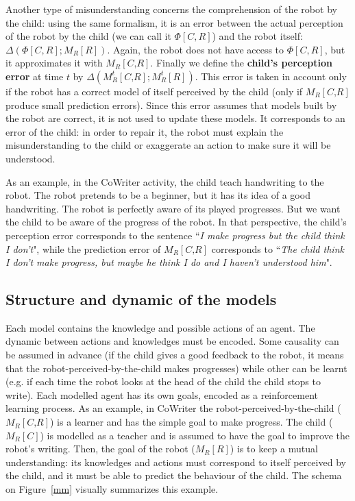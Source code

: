 \documentclass[10pt,a4paper]{article}
\begin{document}
Another type of misunderstanding concerns the comprehension of the robot by the child: using the same formalism, it is an error between the actual perception of the robot by the child (we can call it $\Phi[C,R]$) and the robot itself: $\Delta \left(\Phi[C,R] ; M_R\left[\textit{R}\right]\right)$. Again, the robot does not have access to $\Phi[C,R]$, but it approximates it with $ M_R\left[\textit{C,R}\right]$. Finally we define the \textbf{child's perception error} at time $t$ by $\Delta \left(M^t_R\left[\textit{C,R}\right] ; M^t_R\left[\textit{R}\right]\right)$. This error is taken in account only if the robot has a correct model of itself perceived by the child (only if $M_R\left[\textit{C,R}\right]$ produce small prediction errors). Since this error assumes that models built by the robot are correct, it is not used to update these models. It corresponds to an error of the child: in order to repair it, the robot must explain the misunderstanding to the child or exaggerate an action to make sure it will be understood.

As an example, in the CoWriter activity, the child teach handwriting to the robot. The robot pretends to be a beginner, but it has its idea of a good handwriting. The robot is perfectly aware of its played progresses. But we want the child to be aware of the progress of the robot. In that perspective, the child's perception error corresponds to the sentence ``\textit{I make progress but the child think I don't}", while the prediction error of $M_R\left[\textit{C,R}\right]$ corresponds to ``\textit{The child think I don't make progress, but maybe he think I do and I haven't understood him}".  

\subsection{Structure and dynamic of the models}
Each model contains the knowledge and possible actions of an agent. The dynamic between actions and knowledges must be encoded. Some causality can be assumed in advance (if the child gives a good feedback to the robot, it means that the robot-perceived-by-the-child makes progresses) while other can be learnt (e.g. if each time the robot looks at the head of the child the child stops to write). Each modelled agent has its own goals, encoded as a reinforcement learning process. As an example, in CoWriter the robot-perceived-by-the-child ($ M_R\left[\textit{C,R}\right]$) is a learner and has the simple goal to make progress. The child ($ M_R\left[\textit{C}\right]$) is modelled as a teacher and is assumed to have the goal to improve the robot's writing. Then, the goal of the robot ($ M_R\left[\textit{R}\right]$) is to keep a mutual understanding: its knowledges and actions must correspond to itself perceived by the child, and it must be able to predict the behaviour of the child. The schema on Figure~\ref{mm} visually summarizes this example.
\end{document}
